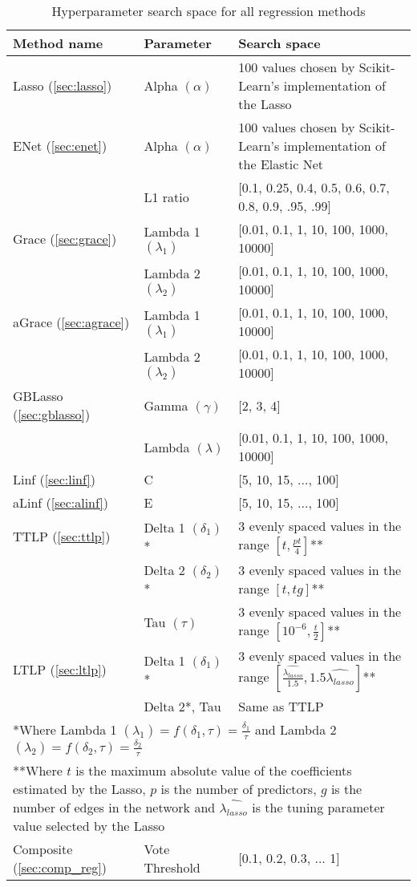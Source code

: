 {\def\arraystretch{1.5}\tabcolsep=10pt
	\begin{table}[t]
		\label{tab:tuning_values}
		\caption{Hyperparameter search space for all regression methods}
		\centering
		\begin{tabular}{l p{2.8cm} p{6.3cm}}
			\hline\hline 
			Method name & Parameter & Search space \\
			\hline\hline
			Lasso (\ref{sec:lasso})		&Alpha $(\alpha)$&100 values chosen by Scikit-Learn's implementation of the Lasso\\
			\hline
			ENet (\ref{sec:enet})	&Alpha $(\alpha)$&100 values chosen by Scikit-Learn's implementation of the Elastic Net\\
			&L1 ratio&[0.1, 0.25, 0.4, 0.5, 0.6, 0.7, 0.8, 0.9, .95, .99]\\
			\hline
			Grace (\ref{sec:grace})			&Lambda 1 $(\lambda_1)$&[0.01, 0.1, 1, 10, 100, 1000, 10000]\\
			&Lambda 2  $(\lambda_2)$&[0.01, 0.1, 1, 10, 100, 1000, 10000]\\
			\hline
			aGrace (\ref{sec:agrace})		&Lambda 1 $(\lambda_1)$&[0.01, 0.1, 1, 10, 100, 1000, 10000]\\
			&Lambda 2  $(\lambda_2)$&[0.01, 0.1, 1, 10, 100, 1000, 10000]\\
			\hline
			GBLasso (\ref{sec:gblasso})		&Gamma $(\gamma)$&[2, 3, 4]\\
			&Lambda $(\lambda)$&[0.01, 0.1, 1, 10, 100, 1000, 10000]\\
			\hline
			Linf (\ref{sec:linf})			&C&[5, 10, 15, ..., 100]\\
			\hline
			aLinf (\ref{sec:alinf})			&E&[5, 10, 15, ..., 100]\\
			\hline
			TTLP (\ref{sec:ttlp})			&Delta 1 $(\delta_1)$*&3 evenly spaced values in the range $[t,\frac{pt}{4}]$**\\
			&Delta 2 $(\delta_2)$*&3 evenly spaced values in the range $[t,tg]$**\\
			&Tau $(\tau)$&3 evenly spaced values in the range $[10^{-6},\frac{t}{2}]$**\\
			\hline
			LTLP (\ref{sec:ltlp})			&Delta 1 $(\delta_1)$*&3 evenly spaced values in the range $[\frac{\hat{\lambda_{lasso}}}{1.5},1.5\hat{\lambda_{lasso}}]$**\\
			&Delta 2*, Tau&Same as TTLP\\
			\multicolumn{3}{p{13.5cm}}{*Where Lambda 1 $(\lambda_1) = f(\delta_1,\tau) = \frac{\delta_1}{\tau}$ and Lambda 2 $(\lambda_2) = f(\delta_2,\tau) = \frac{\delta_2}{\tau}$}\\
			\multicolumn{3}{p{13.5cm}}{**Where $t$ is the maximum absolute value of the coefficients estimated by the Lasso, $p$ is the number of predictors, $g$ is the number of edges in the network and $\hat{\lambda_{lasso}}$ is the tuning parameter value selected by the Lasso}\\
			\hline
			Composite (\ref{sec:comp_reg})	&Vote Threshold&[0.1, 0.2, 0.3, ... 1]\\
			\hline
		\end{tabular}
	\end{table}
}